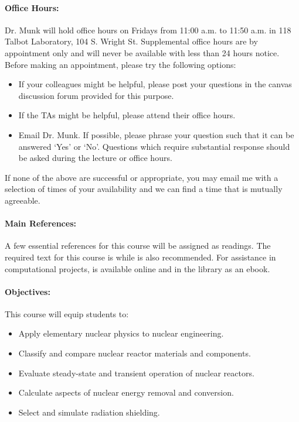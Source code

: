 \documentclass[11pt, a4paper]{article}
\newcommand{\MunkOfficeHourDays}{Fridays\xspace}%
\newcommand{\MunkOfficeHourStart}{11:00 a.m.\xspace}%
\newcommand{\MunkOfficeHourEnd}{11:50 a.m.\xspace}%
\newcommand{\MunkOfficeHourPlace}{118 Talbot Laboratory, 104 S. Wright St.\xspace}
\begin{document}
\paragraph{Office Hours:} Dr. Munk  will hold office hours on
\MunkOfficeHourDays from \MunkOfficeHourStart to \MunkOfficeHourEnd in
\MunkOfficeHourPlace Supplemental office hours are by appointment only
and will never be available with less than 24 hours notice.
Before making an appointment, please try the following options:
\begin{itemize}
\item If your colleagues might be helpful, please post your questions in the
        canvas discussion forum provided for this purpose.
\item If the TAs might be helpful, please attend their office hours.
\item Email Dr. Munk. If possible, please phrase your question such that it
        can be answered `Yes' or `No'.  Questions which require substantial
        response should be asked during the lecture or office hours.
\end{itemize}

If none of the above are successful or appropriate, you may email me with a
selection of times of your availability and we can find a time that is mutually
agreeable.

\paragraph{Main References:}
A few essential references for this course will be assigned as readings. The
required text for this course is \cite{shultis_fundamentals_2016} while
\cite{lamarsh_introduction_2017} is also recommended. For assistance in
computational projects, \cite{scopatz_effective_2015} is available online and
in the library as an ebook.


\renewcommand{\refname}{\normalfont\selectfont\normalsize}\vspace{-1cm}


\paragraph{Objectives:}

This course will equip students to:

\begin{itemize}
\item Apply elementary nuclear physics to nuclear engineering.
\item Classify and compare nuclear reactor materials and components.
\item Evaluate steady-state and transient operation of nuclear reactors.
\item Calculate aspects of nuclear energy removal and conversion.
\item Select and simulate radiation shielding.
\end{itemize}
\end{document}
